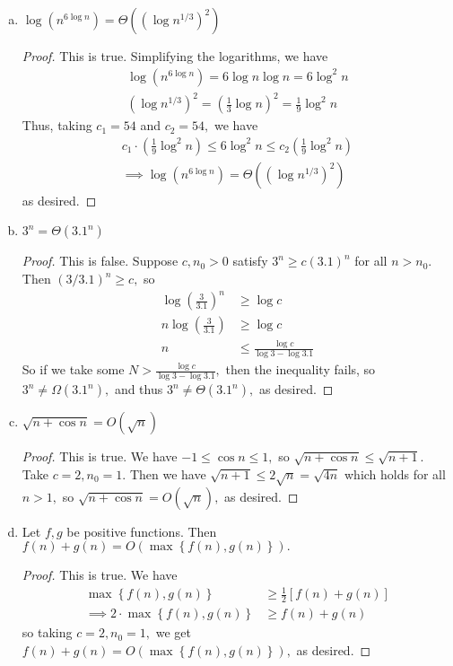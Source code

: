 \documentclass{article}
\begin{document}
\begin{enumerate}[(a)]
	\item $\log(n^{6\log n})=\Theta\left( \left( \log n^{1/3} \right)^2 \right)$
		\begin{proof}
			This is true. Simplifying the logarithms, we have
			\begin{align*}
				\log\left( n^{6\log n} \right) = 6\log n\log n = 6\log^2 n \\
				\left( \log n^{1/3} \right)^2 = \left( \frac{1}{3}\log n \right)^2 = \frac{1}{9}\log^2 n
			\end{align*}
			Thus, taking $c_1=54$ and $c_2=54,$ we have
			\begin{align*}
				c_1\cdot \left( \frac{1}{9} \log^2 n\right) \le 6\log^2 n\le c_2\left( \frac{1}{9} \log^2 n \right) \\
				\implies \log\left( n^{6\log n} \right) = \Theta\left( \left( \log n^{1/3} \right)^2 \right)
			\end{align*}
			as desired.
		\end{proof}

	\item $3^n=\Theta\left( 3.1^n \right)$
		\begin{proof}
			This is false. Suppose $c, n_0>0$ satisfy $3^n\ge c(3.1)^n$ for all $n>n_0.$ Then $(3/3.1)^n\ge c,$ so
			\begin{align*}
				\log \left( \frac{3}{3.1} \right)^n&\ge \log c \\
				n\log\left( \frac{3}{3.1} \right)&\ge\log c \\
				n&\le \frac{\log c}{\log 3-\log 3.1}
			\end{align*}
			So if we take some $N>\frac{\log c}{\log 3-\log 3.1},$ then the inequality fails, so $3^n\neq\Omega(3.1^n),$ and thus $3^n\neq\Theta(3.1^n),$ as desired.
		\end{proof}

	\item $\sqrt{n+\cos n} = O(\sqrt{n})$
		\begin{proof}
			This is true. We have $-1\le \cos n\le 1,$ so $\sqrt{n+\cos n}\le \sqrt{n+1}.$ Take $c=2, n_0=1.$ Then we have $\sqrt{n+1}\le 2\sqrt{n}=\sqrt{4n}$ which holds for all $n>1,$ so $\sqrt{n+\cos n}=O\left( \sqrt{n} \right),$ as desired.
		\end{proof}

	\item Let $f, g$ be positive functions. Then $f(n)+g(n)=O(\max\left\{ f(n), g(n) \right\}).$
		\begin{proof}
			This is true. We have
			\begin{align*}
				\max\left\{ f(n), g(n) \right\}&\ge \frac{1}{2}\left[ f(n)+g(n) \right] \\
				\implies2\cdot\max\left\{ f(n), g(n) \right\} &\ge f(n)+g(n)
			\end{align*}
			so taking $c=2, n_0=1,$ we get $f(n)+g(n)=O\left( \max\left\{ f(n), g(n) \right\} \right),$ as desired.
		\end{proof}


\end{enumerate}
\end{document}
